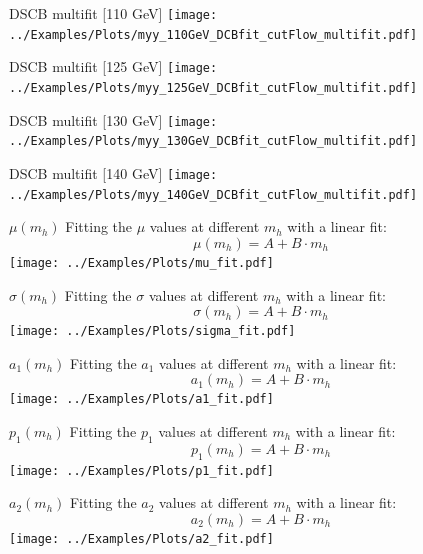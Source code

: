 \documentclass[10pt,UKenglish, leqno, xcolor = dvipsnames]{beamer}
\begin{document}
		\begin{frame}{DSCB multifit [110 GeV]}
			\vfill
			\texttt{[image: ../Examples/Plots/myy\_110GeV\_DCBfit\_cutFlow\_multifit.pdf]}
			\vfill
		\end{frame}
	
		\begin{frame}{DSCB multifit [125 GeV]}
			\vfill
			\texttt{[image: ../Examples/Plots/myy\_125GeV\_DCBfit\_cutFlow\_multifit.pdf]}
			\vfill
		\end{frame}
	
		\begin{frame}{DSCB multifit [130 GeV]}
			\vfill
			\texttt{[image: ../Examples/Plots/myy\_130GeV\_DCBfit\_cutFlow\_multifit.pdf]}
			\vfill
		\end{frame}
	
		\begin{frame}{DSCB multifit [140 GeV]}
			\vfill
			\texttt{[image: ../Examples/Plots/myy\_140GeV\_DCBfit\_cutFlow\_multifit.pdf]}
			\vfill
		\end{frame}
	
		\begin{frame}{$\mu(m_h)$}
			\vfill
			Fitting the $\mu$ values at different $m_h$ with a linear fit:
			$$
			\mu(m_h)=A+B\cdot m_h
			$$
			\centering
			\texttt{[image: ../Examples/Plots/mu\_fit.pdf]}
			\vfill
		\end{frame}
	
		\begin{frame}{$\sigma(m_h)$}
			\vfill
			Fitting the $\sigma$ values at different $m_h$ with a linear fit:
			$$
			\sigma(m_h)=A+B\cdot m_h
			$$
			\centering
			\texttt{[image: ../Examples/Plots/sigma\_fit.pdf]}
			\vfill
		\end{frame}
	
		\begin{frame}{$a_1(m_h)$}
			\vfill
			Fitting the $a_1$ values at different $m_h$ with a linear fit:
			$$
			a_1(m_h)=A+B\cdot m_h
			$$
			\centering
			\texttt{[image: ../Examples/Plots/a1\_fit.pdf]}
			\vfill
		\end{frame}
	
		\begin{frame}{$p_1(m_h)$}
			\vfill
			Fitting the $p_1$ values at different $m_h$ with a linear fit:
			$$
			p_1(m_h)=A+B\cdot m_h
			$$
			\centering
			\texttt{[image: ../Examples/Plots/p1\_fit.pdf]}
			\vfill
		\end{frame}
	
		\begin{frame}{$a_2(m_h)$}
			\vfill
			Fitting the $a_2$ values at different $m_h$ with a linear fit:
			$$
			a_2(m_h)=A+B\cdot m_h
			$$
			\centering
			\texttt{[image: ../Examples/Plots/a2\_fit.pdf]}
			\vfill
		\end{frame}
	
\end{document}
